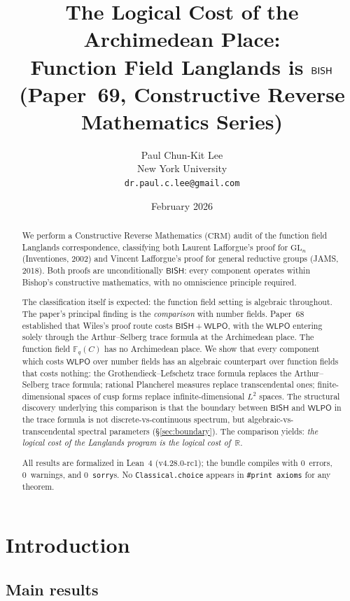 \documentclass[11pt]{article}
\title{The Logical Cost of the Archimedean Place:\\
  Function Field Langlands is $\BISH$\\[6pt]
  {\large (Paper~69, Constructive Reverse Mathematics Series)}}
\author{Paul Chun-Kit Lee \\
New York University \\
\texttt{dr.paul.c.lee@gmail.com}}
\date{February 2026}
\theoremstyle{plain}
\theoremstyle{definition}
\theoremstyle{remark}
\newcommand{\R}{\mathbb{R}}
\newcommand{\Fq}{\mathbb{F}_q}
\newcommand{\GL}{\mathrm{GL}}
\newcommand{\CRM}{\mathrm{CRM}}
\newcommand{\BISH}{\mathsf{BISH}}
\newcommand{\WLPO}{\mathsf{WLPO}}
\begin{document}
\maketitle

\begin{abstract}
We perform a Constructive Reverse Mathematics ($\CRM$) audit of the function field
Langlands correspondence, classifying both Laurent Lafforgue's proof for $\GL_n$
(Inventiones, 2002) and Vincent Lafforgue's proof for general reductive groups
(JAMS, 2018). Both proofs are unconditionally $\BISH$: every component operates
within Bishop's constructive mathematics, with no omniscience principle required.

The classification itself is expected: the function field setting is algebraic
throughout. The paper's principal finding is the \emph{comparison} with number
fields. Paper~68 established that Wiles's proof route costs $\BISH + \WLPO$,
with the $\WLPO$ entering solely through the Arthur--Selberg trace formula at
the Archimedean place. The function field $\Fq(C)$ has no Archimedean place.
We show that every component which costs $\WLPO$ over number fields has an
algebraic counterpart over function fields that costs nothing: the
Grothendieck--Lefschetz trace formula replaces the Arthur--Selberg trace
formula; rational Plancherel measures replace transcendental ones;
finite-dimensional spaces of cusp forms replace infinite-dimensional $L^2$
spaces. The structural discovery underlying this comparison is that the
boundary between $\BISH$ and $\WLPO$ in the trace formula is not
discrete-vs-continuous spectrum, but algebraic-vs-transcendental spectral
parameters (\S\ref{sec:boundary}). The comparison yields:
\emph{the logical cost of the Langlands program is the logical cost of~$\R$}.

All results are formalized in Lean~4 (v4.28.0-rc1); the bundle compiles with
0~errors, 0~warnings, and 0~\texttt{sorry}s. No \texttt{Classical.choice}
appears in \texttt{\#print axioms} for any theorem.
\end{abstract}

\tableofcontents

\section{Introduction}\label{sec:intro}

\subsection{Main results}
\end{document}
